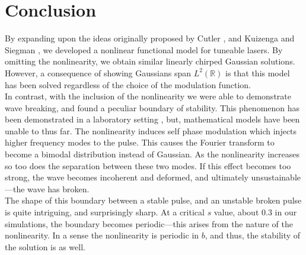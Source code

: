 
\chapter{Conclusion}
By expanding upon the ideas originally proposed by Cutler \cite{cutler}, and Kuizenga and Siegman \cite{kuizenga1970, kuizenga1970a, siegman}, we developed a nonlinear functional model for tuneable lasers. By omitting the nonlinearity, we obtain similar linearly chirped Gaussian solutions. However, a consequence of showing Gaussians span $L^2(\mathbb{R})$ is that this model has been solved regardless of the choice of the modulation function. \\

In contrast, with the inclusion of the nonlinearity we were able to demonstrate wave breaking, and found a peculiar boundary of stability. This phenomenon has been demonstrated in a laboratory setting \cite{agrawal2013, anderson, finot, rothenberg, tomlinson}, but, mathematical models have been unable to thus far. The nonlinearity induces self phase modulation which injects higher frequency modes to the pulse. This causes the Fourier transform to become a bimodal distribution instead of Gaussian. As the nonlinearity increases so too does the separation between these two modes. If this effect becomes too strong, the wave becomes incoherent and deformed, and ultimately unsustainable---the wave has broken. \\

The shape of this boundary between a stable pulse, and an unstable broken pulse is quite intriguing, and surprisingly sharp. At a critical $s$ value, about 0.3 in our simulations, the boundary becomes periodic---this arises from the nature of the nonlinearity. In a sense the nonlinearity is periodic in $b$, and thus, the stability of the solution is as well. \\

